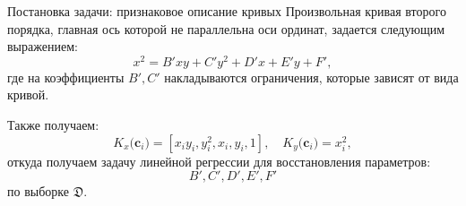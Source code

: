 \documentclass[10pt,pdf,hyperref={unicode}]{beamer}
\begin{document}

\begin{frame}{Постановка задачи: признаковое описание кривых}
\justifying
Произвольная кривая второго порядка, главная ось которой не параллельна оси ординат, задается следующим выражением:
\[
\label{st:coef}
x^2 = B'xy+C'y^2+D'x+E'y+F',
\]
где на коэффициенты $B',C'$ накладываются ограничения, которые зависят от вида кривой. 

Также получаем:
\[
K_x\bigr(\mathbf{c}_i\bigr)=\left[x_iy_i, y_i^2, x_i, y_i, 1\right], \quad K_y\bigr(\mathbf{c}_i\bigr)=x_i^2,
\]
откуда получаем задачу линейной регрессии для восстановления параметров:
\[
B', C', D', E', F'
\] по выборке $\mathfrak{D}$.
\end{frame}

\end{document}

